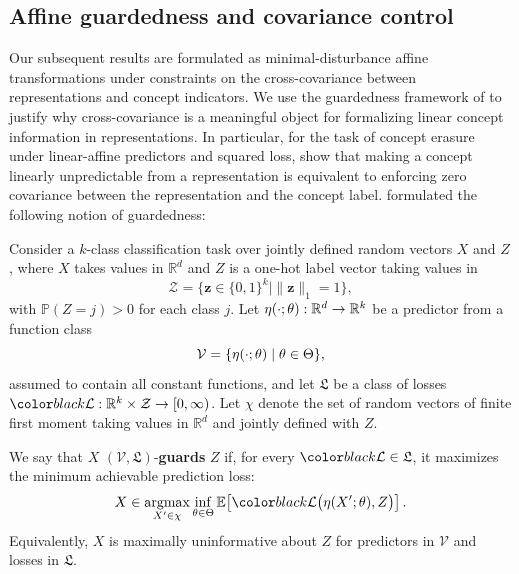 \subsection{Affine guardedness and covariance control}
\label{sec:leace}

Our subsequent results are formulated as minimal-disturbance affine transformations under constraints on the cross-covariance between representations and concept indicators. 
We use the guardedness framework of \citet{ravfogel-etal-2023-linear,belrose2025leace} to justify why cross-covariance is a meaningful object for formalizing linear concept information in representations. 
In particular, for the task of concept erasure under linear-affine predictors and squared loss, \citet{belrose2025leace} show that making a concept linearly unpredictable from a representation is equivalent to enforcing zero covariance between the representation and the concept label. \citet{belrose2025leace} formulated the following notion of guardedness:

\begin{definition}
\label{def:guardedness}
Consider a $k$-class classification task over jointly defined random vectors $X$ and $Z$, where $X$ takes values in $\mathbb R^d$ and $Z$ is a one-hot label vector taking values in
\[
    \mathcal Z = \{\mathbf z \in \{0,1\}^k \mid \|\mathbf z\|_1 = 1\},
\]
with $\mathbb P(Z=j)>0$ for each class $j$. 
Let $\eta(\cdot;\theta):\mathbb R^d \to \mathbb R^k$ be a predictor from a function class
\[
    \mathcal V = \{\eta(\cdot;\theta)\mid \theta\in\Theta\},
\]
assumed to contain all constant functions, and let $\mathfrak L$ be a class of losses
$\loss:\mathbb R^k\times\mathcal Z\to[0,\infty)$. 
Let $\chi$ denote the set of random vectors of finite first moment taking values in $\mathbb R^d$ and jointly defined with $Z$.

We say that $X$ $(\mathcal V,\mathfrak L)$-\textbf{guards} $Z$ if, for every $\loss\in\mathfrak L$, it maximizes the minimum achievable prediction loss:
\begin{equation*}
    X \in 
    \mathop{\mathrm{argmax}}_{X'\in\chi}
    \inf_{\vtheta\in\Theta}
    \mathbb E\!\left[
        \loss\bigl(\eta(X';\vtheta), Z\bigr)
    \right].
\end{equation*}
Equivalently, $X$ is maximally uninformative about $Z$ for predictors in $\mathcal V$ and losses in $\mathfrak L$.
\end{definition}

